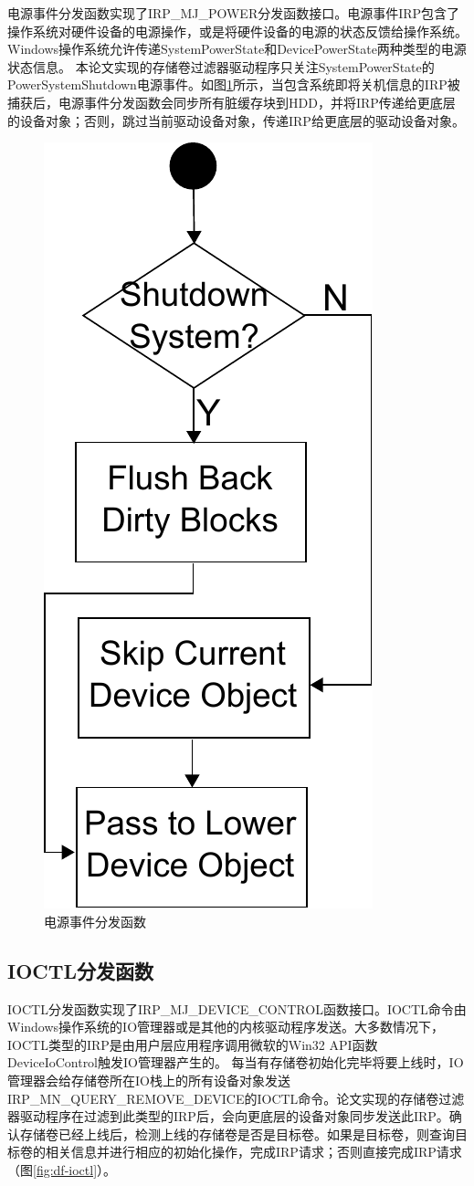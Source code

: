 电源事件分发函数实现了IRP\_MJ\_POWER分发函数接口。电源事件IRP包含了操作系统对硬件设备的电源操作，或是将硬件设备的电源的状态反馈给操作系统。
Windows操作系统允许传递SystemPowerState和DevicePowerState两种类型的电源状态信息。
本论文实现的存储卷过滤器驱动程序只关注SystemPowerState的PowerSystemShutdown电源事件。如图\ref{fig:df-power}所示，当包含系统即将关机信息的IRP被捕获后，电源事件分发函数会同步所有脏缓存块到HDD，并将IRP传递给更底层的设备对象；否则，跳过当前驱动设备对象，传递IRP给更底层的驱动设备对象。

\begin{figure}[H]
\centering
\includegraphics[width=0.25\linewidth]{./graph/df-power}
\caption{电源事件分发函数}
\label{fig:df-power}
\end{figure}

\subsection{IOCTL分发函数}

IOCTL分发函数实现了IRP\_MJ\_DEVICE\_CONTROL函数接口。IOCTL命令由Windows操作系统的IO管理器或是其他的内核驱动程序发送。大多数情况下，IOCTL类型的IRP是由用户层应用程序调用微软的Win32 API函数DeviceIoControl触发IO管理器产生的。
每当有存储卷初始化完毕将要上线时，IO管理器会给存储卷所在IO栈上的所有设备对象发送IRP\_MN\_QUERY\_REMOVE\_DEVICE的IOCTL命令。论文实现的存储卷过滤器驱动程序在过滤到此类型的IRP后，会向更底层的设备对象同步发送此IRP。确认存储卷已经上线后，检测上线的存储卷是否是目标卷。如果是目标卷，则查询目标卷的相关信息并进行相应的初始化操作，完成IRP请求；否则直接完成IRP请求（图\ref{fig:df-ioctl}）。


